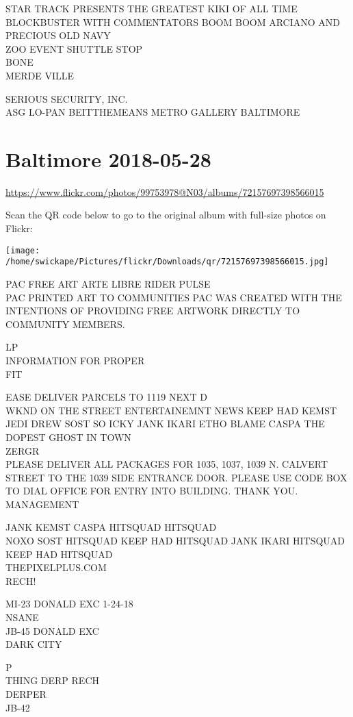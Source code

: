 \documentclass[10pt,letterpaper]{article}
\begin{document}
STAR TRACK PRESENTS THE GREATEST KIKI OF ALL TIME BLOCKBUSTER WITH COMMENTATORS BOOM BOOM ARCIANO AND PRECIOUS OLD NAVY\\
ZOO EVENT SHUTTLE STOP\\
BONE\\
MERDE VILLE

SERIOUS SECURITY, INC.\\
ASG LO{-}PAN BEITTHEMEANS METRO GALLERY BALTIMORE


\section*{Baltimore 2018-05-28}

\url{https://www.flickr.com/photos/99753978@N03/albums/72157697398566015}

Scan the QR code below to go to the original album with full-size photos on Flickr:

\texttt{[image: /home/swickape/Pictures/flickr/Downloads/qr/72157697398566015.jpg]}


PAC FREE ART ARTE LIBRE RIDER PULSE\\
PAC PRINTED ART TO COMMUNITIES PAC WAS CREATED WITH THE INTENTIONS OF PROVIDING FREE ARTWORK DIRECTLY TO COMMUNITY MEMBERS.

LP\\
INFORMATION FOR PROPER\\
FIT

EASE DELIVER PARCELS TO 1119 NEXT D\\
WKND ON THE STREET ENTERTAINEMNT NEWS KEEP HAD KEMST JEDI DREW SOST SO ICKY JANK IKARI ETHO BLAME CASPA THE DOPEST GHOST IN TOWN\\
ZERGR\\
PLEASE DELIVER ALL PACKAGES FOR 1035, 1037, 1039 N. CALVERT STREET TO THE 1039 SIDE ENTRANCE DOOR.  PLEASE USE CODE BOX TO DIAL OFFICE FOR ENTRY INTO BUILDING.  THANK YOU.  MANAGEMENT

JANK KEMST CASPA HITSQUAD HITSQUAD\\
NOXO SOST HITSQUAD KEEP HAD HITSQUAD JANK IKARI HITSQUAD KEEP HAD HITSQUAD\\
THEPIXELPLUS.COM\\
RECH!

MI{-}23 DONALD EXC 1{-}24{-}18\\
NSANE\\
JB{-}45 DONALD EXC\\
DARK CITY

P\\
THING DERP RECH\\
DERPER\\
JB{-}42
\end{document}
